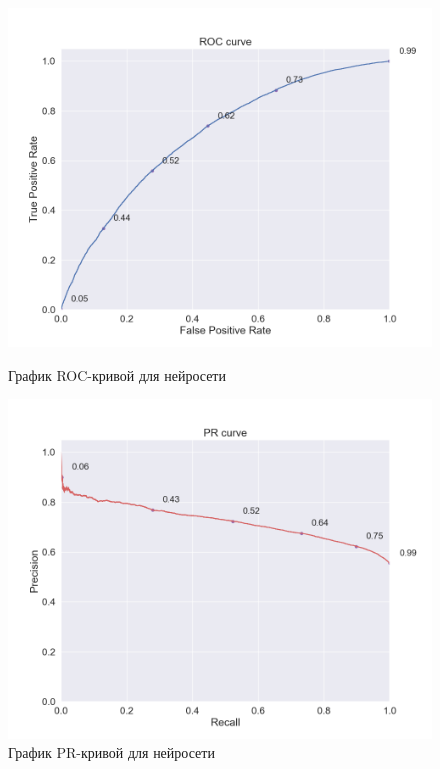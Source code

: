 \begin{figure}[h!]
\centering
\begin{minipage}{.5\textwidth}
\centering
\includegraphics[width=1.0\linewidth]{images/neural_net/roc_curve}
\caption{График ROC-кривой для нейросети}
\label{fig:nn_roc}
\end{minipage}%
\begin{minipage}{.5\textwidth}
\centering
\includegraphics[width=1.0\linewidth]{images/neural_net/pr_curve}
\caption{График PR-кривой для нейросети}
\label{fig:nn_pr}
\end{minipage}
\end{figure}

